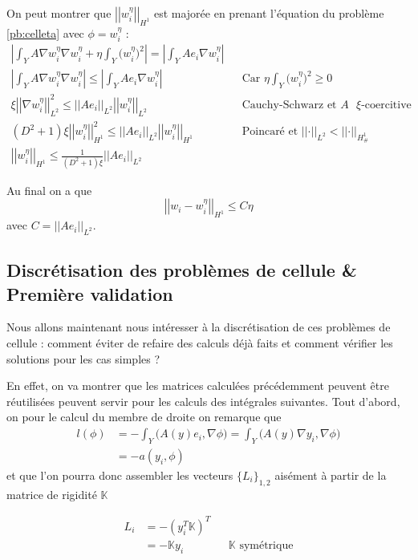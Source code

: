 \documentclass[11pt]{article}
\newcommand{\K}{\mathbb{K}}
\newcommand{\norm}[1]{\left|\left|#1\right|\right|}
\newcommand{\Hd}{H^1_{\#}}
\begin{document}
On peut montrer que $\norm{w_i^\eta}_{H^1}$ est majorée en prenant l'équation du problème \autoref{pb:celleta} avec $\phi=w_i^\eta$ :
\begin{align*}
  \left| \int_Y A \nabla w_i^\eta \nabla w_i^\eta  + \eta \int_Y \big(w_i^\eta\big)^2 \right|  = \left|\int_Y A e_i \nabla w_i^\eta\right| \\
  \left| \int_Y A \nabla w_i^\eta \nabla w_i^\eta \right| \leq \left|\int_Y A e_i \nabla w_i^\eta\right| && \text{Car }\eta\int_Y \big(w_i^\eta\big)^2 \geq  0 \\
  \xi \norm{\nabla w_i^\eta}_{L^2}^2 \leq \norm{A e_i}_{L^2} \norm{ w_i^\eta}_{L^2} && \text{Cauchy-Schwarz et $A$ $\xi$-coercitive} \\
  (D^2+1) \xi \norm{w_i^\eta}_{H^1}^2 \leq \norm{A e_i}_{L^2}\norm{w_i^\eta}_{H^1} && \text{Poincaré et }\norm{\cdot}_{L^2}<\norm{\cdot}_{\Hd}\\
  \norm{w_i^\eta}_{H^1} \leq \frac{1}{(D^2+1) \xi}\norm{A e_i}_{L^2}
\end{align*}

Au final on a que
\begin{equation}
  \norm{w_i-w_i^\eta }_{H^1}  \leq C \eta
\end{equation}
avec $C = \norm{A e_i}_{L^2}$.


\subsection{Discrétisation des problèmes de cellule \& Première validation}

Nous allons maintenant nous intéresser à la discrétisation de ces problèmes de cellule : comment éviter de refaire des calculs déjà faits et comment
vérifier les solutions pour les cas simples ?

En effet, on va montrer que les matrices calculées précédemment peuvent être réutilisées peuvent servir pour les calculs des intégrales
suivantes. Tout d'abord, on pour le calcul du membre de droite on remarque que
\begin{align*}
  l(\phi) &= -\int_Y \big(A(y)e_i, \nabla \phi\big) = \int_Y \big(A(y)\nabla y_i, \nabla \phi\big) \\
          &= -a(y_i, \phi)
\end{align*}
et que l'on pourra donc assembler les vecteurs $\{L_i\}_{1,2}$ aisément à partir de la matrice de rigidité $\K$

\begin{align*}
  L_i &= -(y_i^T\K)^T \\
      &= -\K y_i && \K \text{ symétrique} 
\end{align*}
\end{document}
